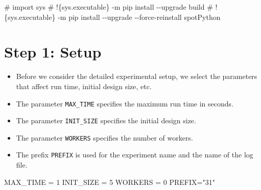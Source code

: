 \documentclass[
  letterpaper,
  DIV=11,
  numbers=noendperiod]{scrreprt}
\newenvironment{Shaded}{\begin{snugshade}}{\end{snugshade}}
\newcommand{\CommentTok}[1]{\textcolor[rgb]{0.37,0.37,0.37}{#1}}
\newcommand{\DecValTok}[1]{\textcolor[rgb]{0.68,0.00,0.00}{#1}}
\newcommand{\NormalTok}[1]{\textcolor[rgb]{0.00,0.23,0.31}{#1}}
\newcommand{\OperatorTok}[1]{\textcolor[rgb]{0.37,0.37,0.37}{#1}}
\newcommand{\StringTok}[1]{\textcolor[rgb]{0.13,0.47,0.30}{#1}}
\providecommand{\tightlist}{%
  \setlength{\itemsep}{0pt}\setlength{\parskip}{0pt}}\usepackage{longtable,booktabs,array}
\begin{document}
\begin{Shaded}
\begin{Highlighting}[]
\CommentTok{\# import sys}
\CommentTok{\# !\{sys.executable\} {-}m pip install {-}{-}upgrade build}
\CommentTok{\# !\{sys.executable\} {-}m pip install {-}{-}upgrade {-}{-}force{-}reinstall spotPython}
\end{Highlighting}
\end{Shaded}

\hypertarget{sec-setup-31}{%
\section{Step 1: Setup}\label{sec-setup-31}}

\begin{itemize}
\tightlist
\item
  Before we consider the detailed experimental setup, we select the
  parameters that affect run time, initial design size, etc.
\item
  The parameter \texttt{MAX\_TIME} specifies the maximum run time in
  seconds.
\item
  The parameter \texttt{INIT\_SIZE} specifies the initial design size.
\item
  The parameter \texttt{WORKERS} specifies the number of workers.
\item
  The prefix \texttt{PREFIX} is used for the experiment name and the
  name of the log file.
\end{itemize}

\begin{Shaded}
\begin{Highlighting}[]
\NormalTok{MAX\_TIME }\OperatorTok{=} \DecValTok{1}
\NormalTok{INIT\_SIZE }\OperatorTok{=} \DecValTok{5}
\NormalTok{WORKERS }\OperatorTok{=} \DecValTok{0}
\NormalTok{PREFIX}\OperatorTok{=}\StringTok{"31"}
\end{Highlighting}
\end{Shaded}
\end{document}

